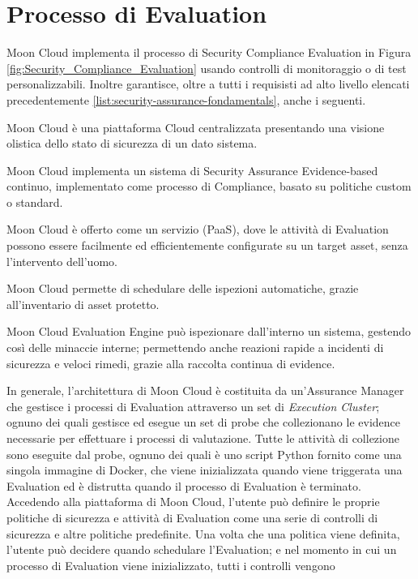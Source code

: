 \section{Processo di Evaluation}
Moon Cloud implementa il processo di Security Compliance Evaluation in Figura \ref{fig:Security_Compliance_Evaluation} usando controlli 
di monitoraggio o di test personalizzabili. Inoltre garantisce, oltre a tutti i requisisti ad alto livello elencati precedentemente 
\ref{list:security-assurance-fondamentals}, anche i seguenti.
\begin{description}
    \item Moon Cloud è una piattaforma Cloud centralizzata presentando una visione olistica dello stato di sicurezza di un dato sistema.
    \item Moon Cloud implementa un sistema di Security Assurance Evidence-based continuo, implementato come processo di Compliance,
    basato su politiche custom o standard.
    \item Moon Cloud è offerto come un servizio (PaaS), dove le attività di Evaluation possono essere facilmente ed efficientemente 
    configurate su un target asset, senza l'intervento dell'uomo.
    \item Moon Cloud permette di schedulare delle ispezioni automatiche, grazie all'inventario di asset protetto.
    \item Moon Cloud Evaluation Engine può ispezionare dall'interno un sistema, gestendo così delle minaccie interne; permettendo anche 
    reazioni rapide a incidenti di sicurezza e veloci rimedi, grazie alla raccolta continua di evidence. 
\end{description}
In generale, l'architettura di Moon Cloud è costituita da un'Assurance Manager che gestisce i processi di Evaluation attraverso un set di 
\textit{Execution Cluster}; ognuno dei quali gestisce ed esegue un set di probe che collezionano le evidence necessarie per effettuare 
i processi di valutazione.
Tutte le attività di collezione sono eseguite dal probe, ognuno dei quali è uno script Python fornito come una singola immagine di Docker, 
che viene inizializzata quando viene triggerata una Evaluation ed è distrutta quando il processo di Evaluation è terminato.\hfill\break
Accedendo alla piattaforma di Moon Cloud, l'utente può definire le proprie politiche di sicurezza e attività di Evaluation come 
una serie di controlli di sicurezza e altre politiche predefinite. Una volta che una politica viene definita, l'utente può 
decidere quando schedulare l'Evaluation; e nel momento in cui un processo di Evaluation viene inizializzato, tutti i controlli vengono 

